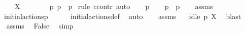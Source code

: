 \begin{isabellebody}
\ \ \ \ {\isacartoucheopen}{\isasymalpha}\ {\isasymin}\ X{\isasymunion}{\isacharbraceleft}{\kern0pt}{\isasymtau}{\isacharbraceright}{\kern0pt}{\isacartoucheclose}\isanewline
\ \ \isanewline
\ \ \ \ {\isacartoucheopen}{\isasymnexists}\ p{\isacharprime}{\kern0pt}{\isachardot}{\kern0pt}\ p\ {\isasymlongmapsto}{\isasymalpha}\ p{\isacharprime}{\kern0pt}{\isacartoucheclose}\isanewline
%
\isadelimproof
%
\endisadelimproof
%
\isatagproof
{}\isamarkupfalse%
\ {\isacharparenleft}{\kern0pt}rule\ ccontr{\isacharcomma}{\kern0pt}\ auto{\isacharparenright}{\kern0pt}\isanewline
\ \ \isamarkupfalse%
\ p{\isacharprime}{\kern0pt}\isanewline
\ \ \isamarkupfalse%
\ {\isacartoucheopen}p\ {\isasymlongmapsto}{\isasymalpha}\ p{\isacharprime}{\kern0pt}{\isacartoucheclose}\isanewline
\ \ \isamarkupfalse%
\ assms{\isacharparenleft}{\kern0pt}{}{\isacharcomma}{\kern0pt}{}{\isacharparenright}{\kern0pt}\ \isamarkupfalse%
\ {\isacartoucheopen}{\isasymalpha}\ {\isasymin}\ initial{\isacharunderscore}{\kern0pt}actions{\isacharparenleft}{\kern0pt}p{\isacharparenright}{\kern0pt}{\isacartoucheclose}\isanewline
\ \ \ \ \isamarkupfalse%
\ initial{\isacharunderscore}{\kern0pt}actions{\isacharunderscore}{\kern0pt}def\ \isamarkupfalse%
\ auto\isanewline
\ \ \isamarkupfalse%
\ assms{\isacharparenleft}{\kern0pt}{}{\isacharparenright}{\kern0pt}\ \isamarkupfalse%
\ {\isacartoucheopen}{\isasymnot}\ idle\ p\ X{\isacartoucheclose}\ \isamarkupfalse%
\ blast\ \isanewline
\ \ \isamarkupfalse%
\ assms{\isacharparenleft}{\kern0pt}{}{\isacharparenright}{\kern0pt}\ \isamarkupfalse%
\ False\ \isamarkupfalse%
\ simp\isanewline
{}\isamarkupfalse%
%
\endisatagproof
{\isafoldproof}%
%
\isadelimproof
\isanewline
%
\endisadelimproof
\isanewline
{}\isamarkupfalse%
\ %
%
\isadelimtheory
%
\endisadelimtheory
%
\isatagtheory
%
\endisatagtheory
{\isafoldtheory}%
%
\isadelimtheory
%
\endisadelimtheory
%
\end{isabellebody}%
\endinput
